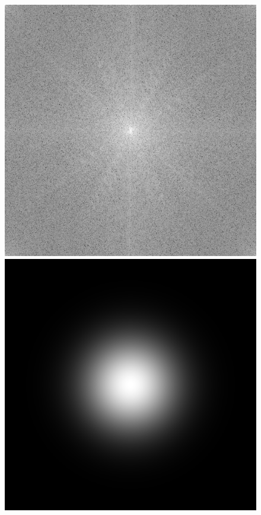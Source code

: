 \documentclass[twoside,twocolumn]{article}
\begin{document}
\begin{figure}[H]
\begin{center}
	\includegraphics[scale=.19]{figures/butterfly_mag_spec_64.png}
	\includegraphics[scale=.19]{figures/butterfly_gau_filter_64.png}

\end{center}
\end{figure}
\end{document}
